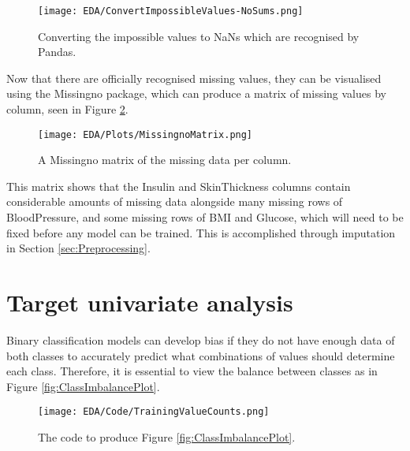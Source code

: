 \begin{figure}[H]
    \centering
    \texttt{[image: EDA/ConvertImpossibleValues-NoSums.png]} %
    \caption{Converting the impossible values to NaNs which are recognised by Pandas.}
    \label{fig:ConvertImpossibleValues}
\end{figure}

\para Now that there are officially recognised missing values, they can be visualised using the Missingno package, which can produce a 
matrix of missing values by column, seen in Figure \ref{fig:MissingnoMatrix}.

\begin{figure}[H]
    \centering
    \texttt{[image: EDA/Plots/MissingnoMatrix.png]}
    \caption{A Missingno matrix of the missing data per column.}
    \label{fig:MissingnoMatrix}
\end{figure}


\para This matrix shows that the Insulin and SkinThickness columns contain considerable amounts of missing data alongside
many missing rows of BloodPressure, and some missing rows of BMI and Glucose, 
which will need to be fixed before any model can be trained. This is accomplished through imputation in Section 
\ref{sec:Preprocessing}.


\pagebreak 


\section{Target univariate analysis}
Binary classification models can develop bias if they do not have enough data of both classes to accurately predict what combinations 
of values should determine each class. Therefore, it is essential to view the balance between classes as in Figure \ref{fig:ClassImbalancePlot}.

\begin{figure}[H]
    \centering
    \texttt{[image: EDA/Code/TrainingValueCounts.png]}
    \caption{The code to produce Figure \ref{fig:ClassImbalancePlot}.}
    \label{fig:ClassImbalancePlotCode}
\end{figure}


